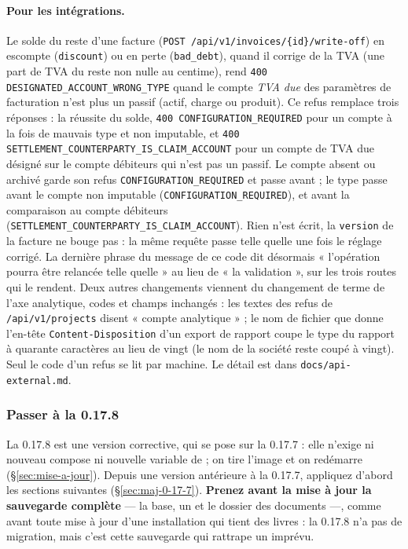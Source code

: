 \documentclass[a4paper,11pt,oneside]{article}
\begin{document}
\begin{sloppypar}
\paragraph{Pour les intégrations.} Le solde du reste d'une facture (\texttt{POST /api/v1/\allowbreak invoices/\allowbreak\{id\}/\allowbreak write-off}) en escompte (\texttt{discount}) ou en perte (\texttt{bad\_debt}), quand il corrige de la TVA (une part de TVA du reste non nulle au centime), rend \texttt{400 DESIGNATED\_ACCOUNT\_WRONG\_TYPE} quand le compte \emph{TVA due} des paramètres de facturation n'est plus un passif (actif, charge ou produit). Ce refus remplace trois réponses : la réussite du solde, \texttt{400 CONFIGURATION\_REQUIRED} pour un compte à la fois de mauvais type et non imputable, et \texttt{400 SETTLEMENT\_COUNTERPARTY\_IS\_CLAIM\_ACCOUNT} pour un compte de TVA due désigné sur le compte débiteurs qui n'est pas un passif. Le compte absent ou archivé garde son refus \texttt{CONFIGURATION\_REQUIRED} et passe avant ; le type passe avant le compte non imputable (\texttt{CONFIGURATION\_REQUIRED}), et avant la comparaison au compte débiteurs (\texttt{SETTLEMENT\_COUNTERPARTY\_IS\_CLAIM\_ACCOUNT}). Rien n'est écrit, la \texttt{version} de la facture ne bouge pas : la même requête passe telle quelle une fois le réglage corrigé. La dernière phrase du message de ce code dit désormais « l'opération pourra être relancée telle quelle » au lieu de « la validation », sur les trois routes qui le rendent. Deux autres changements viennent du changement de terme de l'axe analytique, codes et champs inchangés : les textes des refus de \texttt{/api/v1/\allowbreak projects} disent « compte analytique » ; le nom de fichier que donne l'en-tête \texttt{Content-Disposition} d'un export de rapport coupe le type du rapport à quarante caractères au lieu de vingt (le nom de la société reste coupé à vingt). Seul le code d'un refus se lit par machine. Le détail est dans \texttt{docs/api-external.md}.
\end{sloppypar}

\fussy

\subsubsection{Passer à la 0.17.8}\label{sec:maj-0-17-8}
\sloppy

La 0.17.8 est une version corrective, qui se pose sur la 0.17.7 : elle n'exige ni nouveau compose ni nouvelle variable de  ; on tire l'image et on redémarre (\S\ref{sec:mise-a-jour}). Depuis une version antérieure à la 0.17.7, appliquez d'abord les sections suivantes (\S\ref{sec:maj-0-17-7}). \textbf{Prenez avant la mise à jour la sauvegarde complète} --- la base, un  et le dossier des documents ---, comme avant toute mise à jour d'une installation qui tient des livres : la 0.17.8 n'a pas de migration, mais c'est cette sauvegarde qui rattrape un imprévu.
\end{document}
